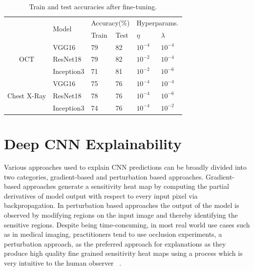 \begin{table}[ht]
\begin{tabular}{|c|l|l|l|l|l|l|}
\hline
\multicolumn{1}{|l|}{\multirow{3}{*}{}} & \multirow{3}{*}{Model} & \multicolumn{2}{l|}{\multirow{2}{*}{Accuracy(\%)}} & \multicolumn{3}{l|}{\multirow{2}{*}{Hyperparams.}} \\
\multicolumn{1}{|l|}{} &  & \multicolumn{2}{l|}{} & \multicolumn{3}{l|}{} \\ \cline{3-7} 
\multicolumn{1}{|l|}{} &  & Train & Test & \multicolumn{2}{l|}{$\eta$} & $\lambda$ \\ \hline
\multirow{3}{*}{OCT} & VGG16 & 79 & 82 & \multicolumn{2}{l|}{$10^{-4}$} & $10^{-4}$ \\ \cline{2-7} 
 & ResNet18 & 79 & 82 & \multicolumn{2}{l|}{$10^{-2}$} & $10^{-4}$ \\ \cline{2-7} 
 & Inception3 & 71 & 81 & \multicolumn{2}{l|}{$10^{-2}$} & $10^{-6}$ \\ \hline
\multirow{3}{*}{Chest X-Ray} & VGG16 & 75 & 76 & \multicolumn{2}{l|}{$10^{-4}$} & $10^{-4}$ \\ \cline{2-7} 
 & ResNet18 & 78 & 76 & \multicolumn{2}{l|}{$10^{-4}$} & $10^{-6}$ \\ \cline{2-7} 
 & Inception3 & 74 & 76 & \multicolumn{2}{l|}{$10^{-4}$} & $10^{-2}$ \\ \hline
\end{tabular}
\caption{Train and test accuracies after fine-tuning.}
\vspace{-6mm}
\label{tbl:finetune_accuracies}
\end{table}


\section{Deep CNN Explainability}
Various approaches used to explain CNN predictions can be broadly divided into two categories, gradient-based and perturbation based approaches. Gradient-based approaches generate a sensitivity heat map by computing the partial derivatives of model output with respect to every input pixel via backpropagation.
In perturbation based approaches the output of the model is observed by modifying regions on the input image and thereby identifying the sensitive regions.
Despite being time-consuming, in most real world use cases such as in medical imaging, practitioners tend to use occlusion experiments, a perturbation approach, as the preferred approach for explanations as they produce high quality fine grained sensitivity heat maps using a process which is very intuitive to the human observer ~\cite{zeiler2014visualizing,jung2017deep,miller2017explanation}.




